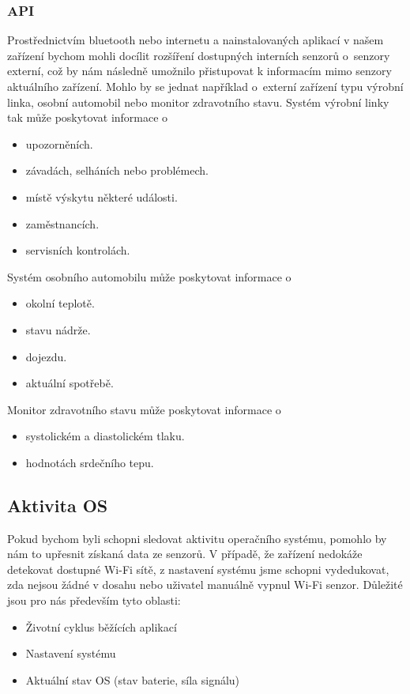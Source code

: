 \documentclass[thesis=M,czech]{FITthesis}[2012/06/26]
\begin{document}
\subsubsection*{API}
Prostřednictvím bluetooth nebo internetu a nainstalovaných aplikací v našem zařízení bychom mohli docílit rozšíření dostupných interních senzorů o~senzory externí, což by nám následně umožnilo přistupovat k informacím mimo  senzory aktuálního zařízení. Mohlo by se jednat například o~externí zařízení typu výrobní linka, osobní automobil nebo monitor zdravotního stavu. Systém výrobní linky tak může poskytovat informace o

\begin{itemize}
\item    upozorněních.
\item    závadách, selháních nebo problémech.
\item    místě výskytu některé události.
\item    zaměstnancích.
\item    servisních kontrolách.
\end{itemize}
Systém osobního automobilu může poskytovat informace o
\begin{itemize}
\item    okolní teplotě.
\item    stavu nádrže.
\item    dojezdu.
\item    aktuální spotřebě.
\end{itemize}
Monitor zdravotního stavu může poskytovat informace o
\begin{itemize}
\item    systolickém a diastolickém tlaku.
\item    hodnotách srdečního tepu.
\end{itemize}

\subsection{Aktivita OS}
Pokud bychom byli schopni sledovat aktivitu operačního systému, pomohlo by nám to upřesnit získaná data ze senzorů. V případě, že zařízení nedokáže detekovat dostupné Wi-Fi sítě, z nastavení systému jsme schopni vydedukovat, zda nejsou žádné v dosahu nebo uživatel manuálně vypnul Wi-Fi senzor. Důležité jsou pro nás především tyto oblasti:

\begin{itemize}
\item    Životní cyklus běžících aplikací
\item    Nastavení systému
\item    Aktuální stav OS (stav baterie, síla signálu)
\end{itemize}
\end{document}

